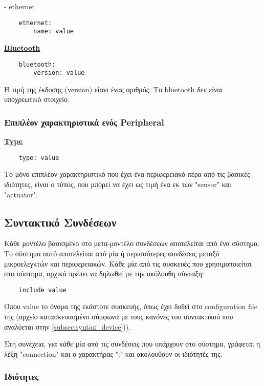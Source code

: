 - ethernet

\begin{lstlisting}
	ethernet:
		name: value
\end{lstlisting}

\textbf{\underline{Bluetooth}}

\begin{lstlisting}
	bluetooth:
		version: value
\end{lstlisting}

Η τιμή της έκδοσης (version) είανι ένας αριθμός. Το bluetooth δεν είναι υποχρεωτικό στοιχείο.

\subsubsection{Επιπλέον χαρακτηριστικά ενός Peripheral}

\textbf{\underline{Type}}

\begin{lstlisting}
	type: value
\end{lstlisting}

Το μόνο επιπλέον χαρακτηριστικό που έχει ένα περιφερειακό πέρα από τις βασικές ιδιότητες, είναι ο τύπος, που μπορεί να έχει ως τιμή ένα εκ των "sensor" και "actuator".

\subsection{Συντακτικό Συνδέσεων}
\label{subsec:syntax_connections}

Κάθε μοντέλο βασισμένο στο μετα-μοντέλο συνδέσεων αποτελείται από ένα σύστημα. Το σύστημα αυτό αποτελείται από μία ή περισσότερες συνδέσεις μεταξύ μικροελεγκτών και περιφερειακών. Κάθε μία από τις συσκευές που χρησιμοποιείται στο σύστημα, αρχικά πρέπει να δηλωθεί με την ακόλουθη σύνταξη:

\begin{lstlisting}
	include value
\end{lstlisting}

Όπου value το όνομα της εκάστοτε συσκευής, όπως έχει δοθεί στο configuration file της (αρχείο κατασκευασμένο σύμφωνα με τους κανόνες του συντακτικού που αναλύεται στην \autoref{subsec:syntax_device})).

Στη συνέχεια, για κάθε μία από τις συνδέσεις που υπάρχουν στο σύστημα, γράφεται η λέξη "connection" και ο χαρακτήρας ":" και ακολουθούν οι ιδιότητές της.

\subsubsection{Ιδιότητες}

